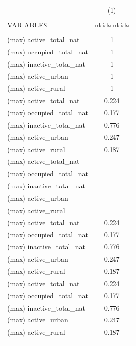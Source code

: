 \begin{tabular}{lc} \hline
 & (1) \\
 &  \\
VARIABLES & nkids nkids \\ \hline
 &  \\
(max) active\_total\_nat & 1 \\
(max) occupied\_total\_nat & 1 \\
(max) inactive\_total\_nat & 1 \\
(max) active\_urban & 1 \\
(max) active\_rural & 1 \\
(max) active\_total\_nat & 0.224 \\
(max) occupied\_total\_nat & 0.177 \\
(max) inactive\_total\_nat & 0.776 \\
(max) active\_urban & 0.247 \\
(max) active\_rural & 0.187 \\
(max) active\_total\_nat &  \\
(max) occupied\_total\_nat &  \\
(max) inactive\_total\_nat &  \\
(max) active\_urban &  \\
(max) active\_rural &  \\
(max) active\_total\_nat & 0.224 \\
(max) occupied\_total\_nat & 0.177 \\
(max) inactive\_total\_nat & 0.776 \\
(max) active\_urban & 0.247 \\
(max) active\_rural & 0.187 \\
(max) active\_total\_nat & 0.224 \\
(max) occupied\_total\_nat & 0.177 \\
(max) inactive\_total\_nat & 0.776 \\
(max) active\_urban & 0.247 \\
(max) active\_rural & 0.187 \\
 &  \\ \hline
\end{tabular}
